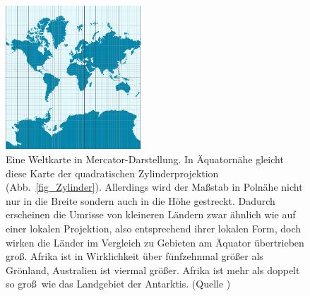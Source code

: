 \begin{figure}
\includegraphics[trim= 0cm 1.0cm 0.3cm 1.0cm,clip,width=0.45\textwidth]{./Bilder/Mercator-proj.png}
\caption{\label{fig_Mercator}%
Eine Weltkarte in Mercator-Darstellung. In \"Aquatorn\"ahe gleicht diese Karte der
quadratischen Zylinderprojektion (Abb.\ \ref{fig_Zylinder}). Allerdings wird der Ma\ss stab in
Poln\"ahe nicht nur in die Breite sondern auch in die H\"ohe gestreckt. Dadurch erscheinen
die Umrisse von kleineren L\"andern zwar \"ahnlich wie auf einer lokalen Projektion, also
entsprechend ihrer lokalen Form, doch wirken
die L\"ander im Vergleich zu Gebieten am \"Aquator \"ubertrieben gro\ss. Afrika ist in Wirklichkeit
\"uber f\"unfzehnmal gr\"o\ss er als Gr\"onland, Australien ist viermal gr\"o\ss er. Afrika ist 
mehr als doppelt so gro\ss\ wie das Landgebiet der Antarktis. (Quelle \cite{WikiMercator})}  
\end{figure}

